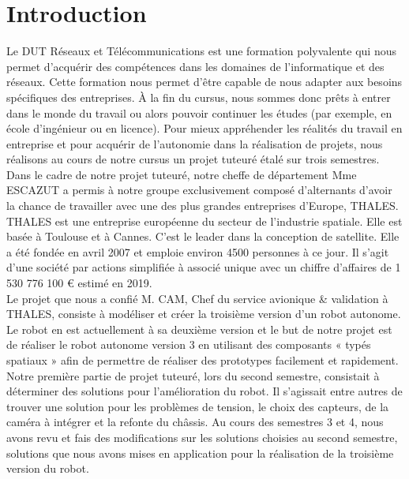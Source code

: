 \documentclass{PackagerQualityN}
\begin{document}
\section*{Introduction}

Le DUT Réseaux et Télécommunications est une formation polyvalente qui nous permet d’acquérir des compétences dans les domaines de l’informatique et des réseaux. Cette formation nous permet d’être capable de nous adapter aux besoins spécifiques des entreprises. À la fin du cursus, nous sommes donc prêts à entrer dans le monde du travail ou alors pouvoir continuer les études (par exemple, en école d’ingénieur ou en licence).
Pour mieux appréhender les réalités du travail en entreprise et pour acquérir de l’autonomie dans la réalisation de projets, nous réalisons au cours de notre cursus un projet tuteuré étalé sur trois semestres.\\

Dans le cadre de notre projet tuteuré, notre cheffe de département Mme ESCAZUT a permis à notre groupe exclusivement composé d’alternants d’avoir la chance de travailler avec une des plus grandes entreprises d’Europe, THALES.\\ 

THALES est une entreprise européenne du secteur de l’industrie spatiale. Elle est basée à Toulouse et à Cannes. C'est le leader dans la conception de satellite. Elle a été fondée en avril 2007 et emploie environ 4500 personnes à ce jour. Il s’agit d’une société par actions simplifiée à associé unique avec un chiffre d’affaires de 1 530 776 100 € estimé en 2019.\\


Le projet que nous a confié M. CAM, Chef du service avionique \& validation à THALES, consiste à modéliser et créer la troisième version d’un robot autonome. Le robot en est actuellement à sa deuxième version et le but de notre projet est de réaliser le robot autonome version 3 en utilisant des composants « typés spatiaux » afin de permettre de réaliser des prototypes facilement et rapidement.\\

Notre première partie de projet tuteuré, lors du second semestre, consistait à déterminer des solutions pour l’amélioration du robot. Il s’agissait entre autres de trouver une solution pour les problèmes de tension, le choix des capteurs, de la caméra à intégrer et la refonte du châssis. Au cours des semestres 3 et 4, nous avons revu et fais des modifications sur les solutions choisies au second semestre, solutions que nous avons mises en application pour la réalisation de la troisième version du robot.\\
\end{document}
